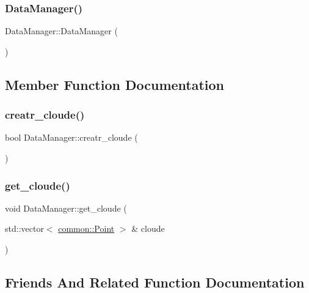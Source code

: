 \subsubsection{\texorpdfstring{Data\+Manager()}{DataManager()}}
{\footnotesize\ttfamily Data\+Manager\+::\+Data\+Manager (\begin{DoxyParamCaption}{ }\end{DoxyParamCaption})}



\subsection{Member Function Documentation}
\mbox{\label{classDataManager_a979d747ea8548e6a578cd5b1df10734e}} 
\subsubsection{\texorpdfstring{creatr\+\_\+cloude()}{creatr\_cloude()}}
{\footnotesize\ttfamily bool Data\+Manager\+::creatr\+\_\+cloude (\begin{DoxyParamCaption}{ }\end{DoxyParamCaption})}

\mbox{\label{classDataManager_a86a781c3314235da186b0e4cb31d7e98}} 
\subsubsection{\texorpdfstring{get\+\_\+cloude()}{get\_cloude()}}
{\footnotesize\ttfamily void Data\+Manager\+::get\+\_\+cloude (\begin{DoxyParamCaption}\item[{std\+::vector$<$ \mbox{\hyperlink{structcommon_1_1Point}{common\+::\+Point}} $>$ \&}]{cloude }\end{DoxyParamCaption})}



\subsection{Friends And Related Function Documentation}
\mbox{\label{classDataManager_a08bca24b08df51759eafe2bf56bd4f3f}} 
